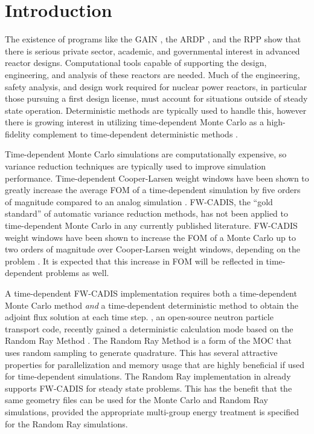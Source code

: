 \section{Introduction}
\label{sec:intro}

The existence of programs like the \Gls{GAIN} \cite{doe_gain_2025}, the
\Gls{ARDP} \cite{doe_ardp_2025}, and the \Gls{RPP} \cite{doe_rpp_2025} show
that there is serious private sector, academic, and governmental interest in
advanced reactor designs. Computational tools capable of supporting the design,
engineering, and analysis of these reactors are needed. Much of the
engineering, safety analysis, and design work required for nuclear power
reactors, in particular those pursuing a first design license, must account for
situations outside of steady state operation. Deterministic methods are
typically used to handle this, however there is growing interest in utilizing
time-dependent Monte Carlo as a high-fidelity complement to time-dependent
deterministic methods \cite{faucher_new_2018, jang_advances_2023,
    romero-barrientos_td_2022, legrady_pb_2020, shaw_hybrid_2025,
molnar_gpu_2019}.

Time-dependent Monte Carlo simulations are computationally expensive, so
variance reduction techniques are typically used to improve simulation
performance. Time-dependent Cooper-Larsen weight windows have been shown to
greatly increase the average \Gls{FOM} of a time-dependent simulation by five
orders of magnitude compared to an analog simulation \cite{northrop_study_2024}.
\Gls{FW-CADIS}, the ``gold standard'' \cite{munk_review_2019} of automatic
variance reduction methods, has not been applied to time-dependent Monte Carlo
in any currently published literature.  \Gls{FW-CADIS} weight windows have been
shown to increase the \Gls{FOM} of a Monte Carlo up to two orders of magnitude
over Cooper-Larsen weight windows, depending on the problem
\cite{peplow_comparison_2012}. It is expected that this increase in \Gls{FOM}
will be reflected in time-dependent problems as well.

A time-dependent \Gls{FW-CADIS} implementation requires both a time-dependent
Monte Carlo method {\it and} a time-dependent deterministic method to obtain the
adjoint flux solution at each time step. \OpenMC, an open-source neutron
particle transport code, recently gained a deterministic calculation mode based
on the Random Ray Method \cite{tramm_random_2024}. The Random Ray Method is a
form of the \gls{MOC} that uses random sampling to generate quadrature. This has
several attractive properties for parallelization and memory usage that are
highly beneficial if used for time-dependent simulations. The Random Ray
implementation in \OpenMC already supports \Gls{FW-CADIS} for steady state
problems. This has the benefit that the same geometry files can be used for the
Monte Carlo and Random Ray simulations, provided the appropriate multi-group
energy treatment is specified for the Random Ray simulations.

